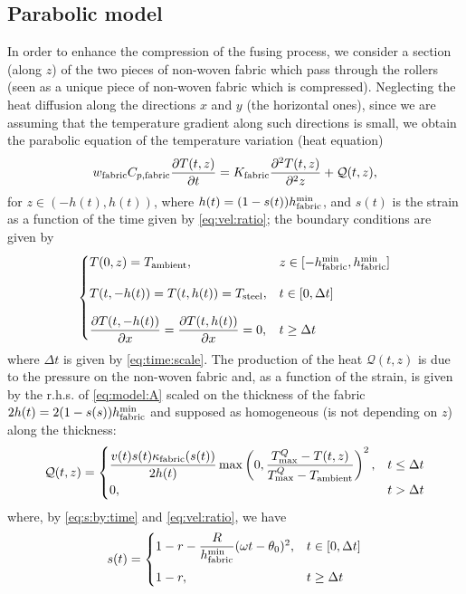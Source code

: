 \subsection{Parabolic model}
\label{subsec:para}
In order to enhance the compression of the fusing process, we consider a section (along $z$) of the two pieces of non-woven fabric which pass through the rollers (seen as a unique piece of non-woven fabric which is compressed). Neglecting the heat diffusion along the directions $x$ and $y$ (the horizontal ones), since we are assuming that the temperature gradient along such directions is small, we obtain the parabolic equation of the temperature variation (heat equation)
\begin{equation}\label{pde:heat}
 w_{\mathrm{fabric}}C_{p,\textrm{fabric}} \dfrac{\partial T(t,z)}{\partial t}
 = 
 K_{\mathrm{fabric}}
 \dfrac{\partial^2 T(t,z)}{\partial^2 z}+\mathcal{Q} (t,z),
\end{equation}
for $z\in (-h(t),h(t))$, where $h(t)=(1-s(t))h_{\mathrm{fabric}}^{\min}$, and $s(t)$ is the strain as a function of the time given by \eqref{eq:vel:ratio}; the boundary conditions are given by
\begin{equation}\label{pde:bc}
  \begin{cases}
  T(0,z) = T_{\textrm{ambient}}, & z\in[-h_{\mathrm{fabric}}^{\min},h_{\mathrm{fabric}}^{\min}] \\[1em]
  T(t,-h(t)) = T(t,h(t)) = T_{\mathrm{steel}}, & t\in[0,\Delta t] \\[1em]
  \dfrac{\partial T(t,-h(t))}{\partial x} =
  \dfrac{\partial T(t,h(t))}{\partial x}= 0, & t\geq \Delta t
  \end{cases}
\end{equation}
where $\Delta t$ is given by \eqref{eq:time:scale}.
The production of the heat $\mathcal{Q} (t,z)$ is due to the pressure on the non-woven fabric and, as a function of the strain, is given by the r.h.s. of \eqref{eq:model:A} scaled on the thickness of the fabric $2h(t)=2(1-s(s))h_{\mathrm{fabric}}^{\min}$ and supposed as homogeneous (is not depending on $z$) along the thickness:
\begin{equation}
  \mathcal{Q}(t,z)=
  \begin{cases}
  \dfrac{v(t)s(t)\kappa_{\mathrm{fabric}}(s(t))}{2h(t)}\max\left(0,\dfrac{{T_{\max}^Q}-T(t,z)}{{T_{\max}^Q}-T_{\textrm{ambient}}}\right)^2,
  & t \leq \Delta t
  \\
  0, & t > \Delta t
  \end{cases}
\end{equation}
where, by \eqref{eq:s:by:time} and \eqref{eq:vel:ratio}, we have
\begin{equation}
  s(t) =
  \begin{cases}
  1-r - \dfrac{R}{h_{\mathrm{fabric}}^{\min}}(\omega t - \theta_0)^2, & t\in[0,\Delta t] \\[1em]
  1-r, &  t\geq \Delta t
  \end{cases}
\end{equation}
